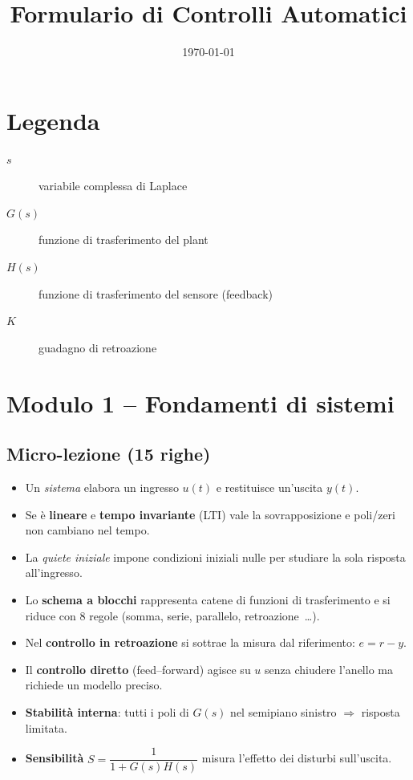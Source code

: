 \documentclass[a4paper,11pt]{article}
\title{Formulario di Controlli Automatici}
\author{}
\date{\today}
\begin{document}
\maketitle
\tableofcontents
\newpage

\section*{Legenda}
\begin{description}
  \item[$s$] variabile complessa di Laplace
  \item[$G(s)$] funzione di trasferimento del plant
  \item[$H(s)$] funzione di trasferimento del sensore (feedback)
  \item[$K$] guadagno di retroazione
\end{description}

\section{Modulo 1 – Fondamenti di sistemi}

\subsection*{Micro-lezione (15 righe)}
\begin{itemize}
  \item Un \emph{sistema} elabora un ingresso $u(t)$ e restituisce un'uscita $y(t)$.
  \item Se è \textbf{lineare} e \textbf{tempo invariante} (LTI) vale la sovrapposizione e poli/zeri non cambiano nel tempo.
  \item La \emph{quiete iniziale} impone condizioni iniziali nulle per studiare la sola risposta all’ingresso.
  \item Lo \textbf{schema a blocchi} rappresenta catene di funzioni di trasferimento e si riduce con 8 regole (somma, serie, parallelo, retroazione …).
  \item Nel \textbf{controllo in retroazione} si sottrae la misura dal riferimento: $e=r-y$.
  \item Il \textbf{controllo diretto} (feed–forward) agisce su $u$ senza chiudere l’anello ma richiede un modello preciso.
  \item \textbf{Stabilità interna}: tutti i poli di $G(s)$ nel semipiano sinistro $\Rightarrow$ risposta limitata.
  \item \textbf{Sensibilità} $S=\dfrac{1}{1+G(s)H(s)}$ misura l’effetto dei disturbi sull’uscita.
\end{itemize}
\end{document}
